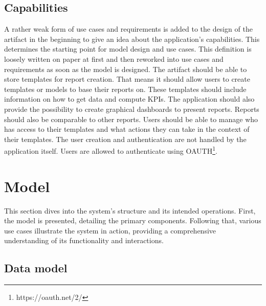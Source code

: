 \subsection{Capabilities}

A rather weak form of use cases and requirements is added to the design of the artifact in the beginning to give an idea about the application's capabilities. This determines the starting point for model design and use cases. This definition is loosely written on paper at first and then reworked into use cases and requirements as soon as the model is designed. The artifact should be able to store templates for report creation. That means it should allow users to create templates or models to base their reports on. These templates should include information on how to get data and compute KPIs. The application should also provide the possibility to create graphical dashboards to present reports. Reports should also be comparable to other reports. Users should be able to manage who has access to their templates and what actions they can take in the context of their templates. The user creation and authentication are not handled by the application itself. Users are allowed to authenticate using OAUTH\footnote{https://oauth.net/2/}.

\section{Model}

This section dives into the system's structure and its intended operations. First, the model is presented, detailing the primary components. Following that, various use cases illustrate the system in action, providing a comprehensive understanding of its functionality and interactions.

\subsection{Data model}

